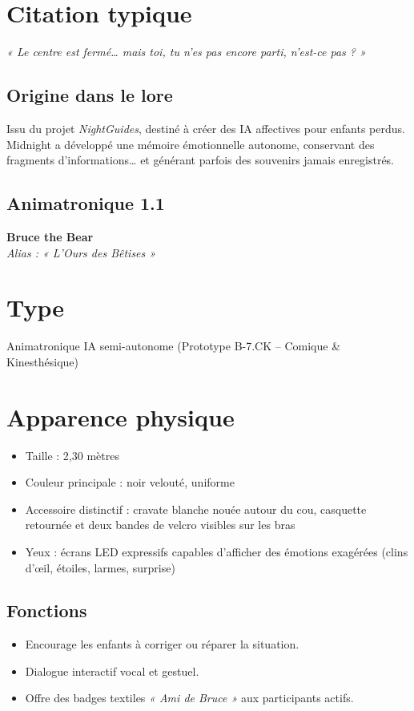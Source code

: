 \section*{Citation typique}
\textit{« Le centre est fermé… mais toi, tu n’es pas encore parti, n’est-ce pas ? »}

\subsection*{Origine dans le lore}
Issu du projet \textit{NightGuides}, destiné à créer des IA affectives pour enfants perdus. Midnight a développé une mémoire émotionnelle autonome, conservant des fragments d’informations… et générant parfois des souvenirs jamais enregistrés.

\subsection{Animatronique 1.1}

\textbf{Bruce the Bear}\\
\textit{Alias : « L’Ours des Bêtises »}

\section*{Type}
Animatronique IA semi-autonome (Prototype B-7.CK – Comique \& Kinesthésique)

\section*{Apparence physique}
\begin{itemize}[noitemsep]
  \item Taille : 2,30 mètres
  \item Couleur principale : noir velouté, uniforme
  \item Accessoire distinctif : cravate blanche nouée autour du cou, casquette retournée et deux bandes de velcro visibles sur les bras
  \item Yeux : écrans LED expressifs capables d’afficher des émotions exagérées (clins d’œil, étoiles, larmes, surprise)
\end{itemize}

\subsection*{Fonctions}
\begin{itemize}[noitemsep]
  \item Encourage les enfants à corriger ou réparer la situation.
  \item Dialogue interactif vocal et gestuel.
  \item Offre des badges textiles \textit{« Ami de Bruce »} aux participants actifs.
\end{itemize}

